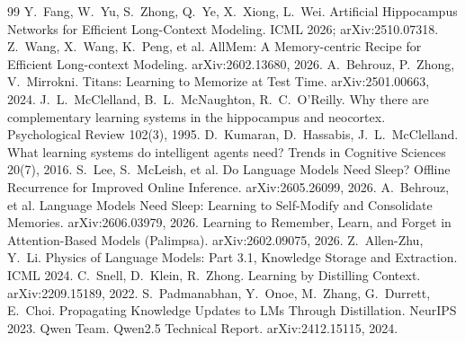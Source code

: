 \documentclass[letterpaper,10pt,twocolumn]{article}
\begin{document}
{\small
\begin{thebibliography}{99}\setlength{\itemsep}{0pt}
 Y.~Fang, W.~Yu, S.~Zhong, Q.~Ye, X.~Xiong, L.~Wei. Artificial Hippocampus Networks for Efficient Long-Context Modeling. ICML 2026; arXiv:2510.07318.
 Z.~Wang, X.~Wang, K.~Peng, et al. AllMem: A Memory-centric Recipe for Efficient Long-context Modeling. arXiv:2602.13680, 2026.
 A.~Behrouz, P.~Zhong, V.~Mirrokni. Titans: Learning to Memorize at Test Time. arXiv:2501.00663, 2024.
 J.~L.~McClelland, B.~L.~McNaughton, R.~C.~O'Reilly. Why there are complementary learning systems in the hippocampus and neocortex. Psychological Review 102(3), 1995.
 D.~Kumaran, D.~Hassabis, J.~L.~McClelland. What learning systems do intelligent agents need? Trends in Cognitive Sciences 20(7), 2016.
 S.~Lee, S.~McLeish, et al. Do Language Models Need Sleep? Offline Recurrence for Improved Online Inference. arXiv:2605.26099, 2026.
 A.~Behrouz, et al. Language Models Need Sleep: Learning to Self-Modify and Consolidate Memories. arXiv:2606.03979, 2026.
 Learning to Remember, Learn, and Forget in Attention-Based Models (Palimpsa). arXiv:2602.09075, 2026.
 Z.~Allen-Zhu, Y.~Li. Physics of Language Models: Part 3.1, Knowledge Storage and Extraction. ICML 2024.
 C.~Snell, D.~Klein, R.~Zhong. Learning by Distilling Context. arXiv:2209.15189, 2022.
 S.~Padmanabhan, Y.~Onoe, M.~Zhang, G.~Durrett, E.~Choi. Propagating Knowledge Updates to LMs Through Distillation. NeurIPS 2023.
 Qwen Team. Qwen2.5 Technical Report. arXiv:2412.15115, 2024.
\end{thebibliography}}
\end{document}
